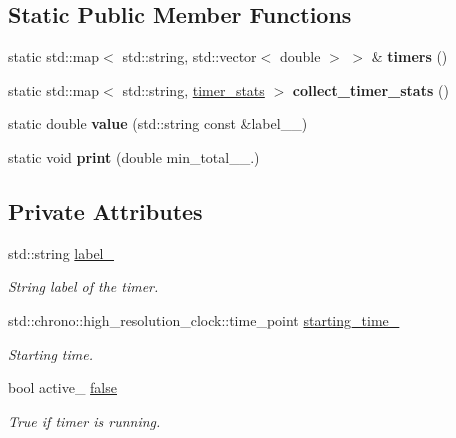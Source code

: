 \subsection*{Static Public Member Functions}
\begin{DoxyCompactItemize}
\item 
\hypertarget{classsddk_1_1timer_ad08967e98267bf5215197759a305dac9}{}static std\+::map$<$ std\+::string, std\+::vector$<$ double $>$ $>$ \& {\bfseries timers} ()\label{classsddk_1_1timer_ad08967e98267bf5215197759a305dac9}

\item 
\hypertarget{classsddk_1_1timer_af467fe7da3b80aaf462b6750d5c869ae}{}static std\+::map$<$ std\+::string, \hyperlink{structsddk_1_1timer_1_1timer__stats}{timer\+\_\+stats} $>$ {\bfseries collect\+\_\+timer\+\_\+stats} ()\label{classsddk_1_1timer_af467fe7da3b80aaf462b6750d5c869ae}

\item 
\hypertarget{classsddk_1_1timer_a81c59ca698b3fb67afac7b75237b2ebc}{}static double {\bfseries value} (std\+::string const \&label\+\_\+\+\_\+)\label{classsddk_1_1timer_a81c59ca698b3fb67afac7b75237b2ebc}

\item 
\hypertarget{classsddk_1_1timer_a0f3b8125adc14c0c0723f92809d266a8}{}static void {\bfseries print} (double min\+\_\+total\+\_\+\+\_.)\label{classsddk_1_1timer_a0f3b8125adc14c0c0723f92809d266a8}

\end{DoxyCompactItemize}
\subsection*{Private Attributes}
\begin{DoxyCompactItemize}
\item 
std\+::string \hyperlink{classsddk_1_1timer_a78daa1e180d40695082fb541b209c1ac}{label\+\_\+}
\begin{DoxyCompactList}\small\item\em String label of the timer. \end{DoxyCompactList}\item 
std\+::chrono\+::high\+\_\+resolution\+\_\+clock\+::time\+\_\+point \hyperlink{classsddk_1_1timer_a5f2db64ecb12bc8cee0038e45aecfb66}{starting\+\_\+time\+\_\+}
\begin{DoxyCompactList}\small\item\em Starting time. \end{DoxyCompactList}\item 
bool active\+\_\+ \hyperlink{classsddk_1_1timer_a66ae4b2bda5dc90b0e68ae5e1f2c8fae}{false}
\begin{DoxyCompactList}\small\item\em True if timer is running. \end{DoxyCompactList}\end{DoxyCompactItemize}


